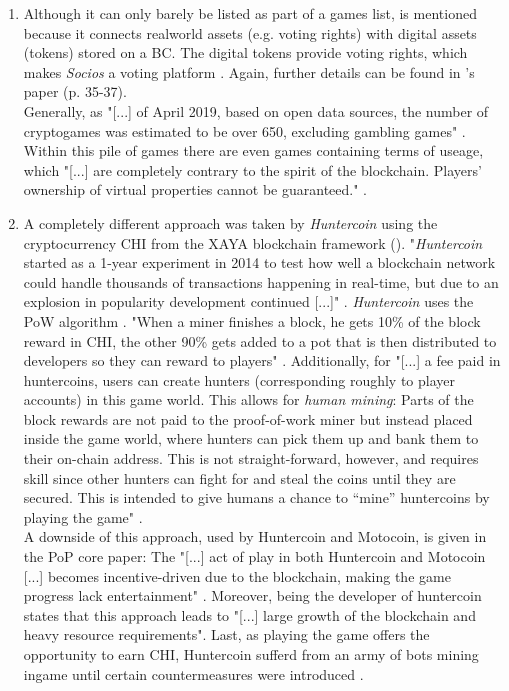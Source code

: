 \begin{enumerate}
	\item Although it can only barely be listed as part of a games list, \citet{Socios.com.2021} is mentioned
	because it connects realworld assets (e.g. voting rights) with digital assets (tokens) stored on a \gls{BC}.
	The digital tokens provide voting rights, which makes \textit{Socios} a voting platform \cite[29]{Laneve.2019}.
	Again, further details can be found in \citet{Laneve.2019}'s paper (p. 35-37). \\
	Generally, as "[...] of April 2019, based on open data sources, the number of cryptogames was estimated to be over 650, excluding gambling games" \cite[3]{Serada.2020}.
	Within this pile of games there are even games containing terms of useage,
	which "[...] are completely contrary to the spirit of the blockchain. Players’ ownership of virtual properties cannot be guaranteed." \cite[2]{Min.2019}.
	
	\item A completely different approach was taken by \textit{Huntercoin} using the cryptocurrency CHI from the XAYA blockchain framework (\citet{xaya.io.2021}).
	"\textit{Huntercoin} started as a 1-year experiment in 2014 to test how well a blockchain
	network could handle thousands of transactions happening in real-time, but
	due to an explosion in popularity development continued [...]" \cite[24]{Laneve.2019}.
	\textit{Huntercoin} uses the \gls{PoW} algorithm \cite[85]{Kraft.2016}.
	"When a miner finishes a block, he gets 10\% of the block reward in CHI,
	the other 90\% gets added to a pot that is then distributed to developers so they can reward to players" \cite[44]{Laneve.2019}.
	Additionally, for "[...] a fee paid in huntercoins, users can create hunters (corresponding roughly to player accounts) in this game world.
	This allows for \textit{human mining}: Parts of the block rewards are not paid to the proof-of-work miner
	but instead placed inside the game world, where hunters can pick them up and bank them to their on-chain address.
	This is not straight-forward, however, and requires skill since other hunters can fight for and steal the coins until they are secured.
	This is intended to give humans a chance to “mine” huntercoins by playing the game" \cite[85]{Kraft.2016}. \\
	A downside of this approach, used by Huntercoin and Motocoin, is given in the \gls{PoP} core paper:
	The "[...] act of play in both Huntercoin and Motocoin [...] becomes incentive-driven due to the blockchain, making the game progress lack entertainment" \cite[21]{Yuen.2019}.
	Moreover, \citet[84]{Kraft.2016} being the developer of huntercoin states that this approach leads to "[...] large growth of the blockchain and heavy resource requirements".
	Last, as playing the game offers the opportunity to earn CHI, Huntercoin sufferd from an army of bots mining ingame until certain countermeasures were introduced \cite[88-89]{Kraft.2016}.
	

\end{enumerate}

